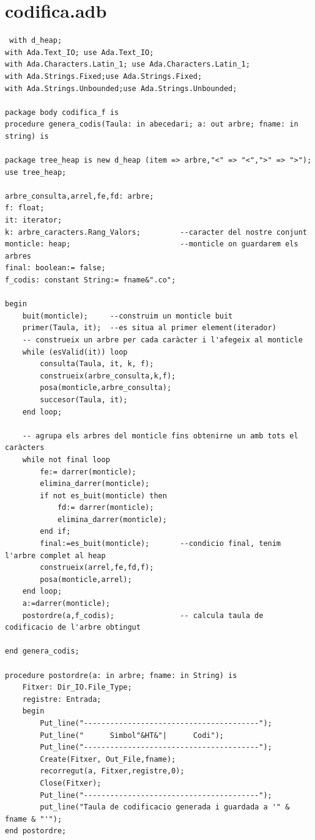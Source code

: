 \documentclass[a4paper,12pt]{article}
\begin{document}
\section{codifica.adb}
\begin{lstlisting}
 with d_heap;
with Ada.Text_IO; use Ada.Text_IO;
with Ada.Characters.Latin_1; use Ada.Characters.Latin_1;
with Ada.Strings.Fixed;use Ada.Strings.Fixed;
with Ada.Strings.Unbounded;use Ada.Strings.Unbounded; 

package body codifica_f is
procedure genera_codis(Taula: in abecedari; a: out arbre; fname: in string) is

package tree_heap is new d_heap (item => arbre,"<" => "<",">" => ">");	use tree_heap;

arbre_consulta,arrel,fe,fd: arbre; 
f: float; 
it: iterator;
k: arbre_caracters.Rang_Valors; 		--caracter del nostre conjunt 
monticle: heap; 						--monticle on guardarem els arbres
final: boolean:= false;
f_codis: constant String:= fname&".co";

begin
	buit(monticle);		--construim un monticle buit
	primer(Taula, it);	--es situa al primer element(iterador)
	-- construeix un arbre per cada caràcter i l'afegeix al monticle
	while (esValid(it)) loop
		consulta(Taula, it, k, f);
		construeix(arbre_consulta,k,f);
		posa(monticle,arbre_consulta);
		succesor(Taula, it);
	end loop;
	
	-- agrupa els arbres del monticle fins obtenirne un amb tots el caràcters
	while not final loop	
		fe:= darrer(monticle);
		elimina_darrer(monticle);
		if not es_buit(monticle) then
			fd:= darrer(monticle);
			elimina_darrer(monticle);
		end if;
		final:=es_buit(monticle); 		--condicio final, tenim l'arbre complet al heap
		construeix(arrel,fe,fd,f);
		posa(monticle,arrel);
	end loop;
	a:=darrer(monticle);
	postordre(a,f_codis);				-- calcula taula de codificacio de l'arbre obtingut
	
end genera_codis;

procedure postordre(a: in arbre; fname: in String) is
	Fitxer: Dir_IO.File_Type;
	registre: Entrada;
	begin
		Put_line("----------------------------------------");
		Put_line("      Simbol"&HT&"|      Codi");
		Put_line("----------------------------------------");
		Create(Fitxer, Out_File,fname);
		recorregut(a, Fitxer,registre,0);
		Close(Fitxer);
		Put_line("----------------------------------------");
		put_line("Taula de codificacio generada i guardada a '" & fname & "'");
end postordre;
		

\end{lstlisting}
\end{document}
